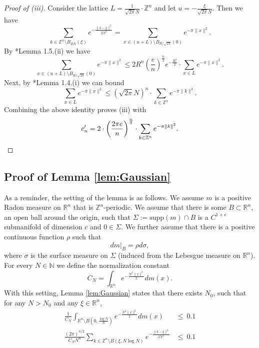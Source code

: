 \documentclass[11pt,letterpaper]{amsart}
\theoremstyle{definition}
\theoremstyle{plain}
\newcommand{\R}{{\mathbb R}}
\newcommand{\N}{{\mathbb N}}
\newcommand{\Z}{{\mathbb Z}}
\begin{document}
\begin{proof}[Proof of (iii)]
Consider the lattice $L=\frac{1}{\sqrt{2\pi}N}\cdot\Z^n$ and let $u=-\frac{\xi}{\sqrt{2\pi}N}$. Then we have
\[\sum_{k\in\Z^n\setminus B_{RN}(\xi)}e^{-\tfrac{\|k-\xi\|^2}{2N^2}}=  \sum_{x\in (u+L)\setminus B_{R/\sqrt{2\pi}}(0)}e^{-\pi\|x\|^2}.\]
By \cite{Banaszczyk}*{Lemma 1.5.(ii)} we have
\begin{equation*}
    \sum_{x\in (u+L)\setminus B_{R/\sqrt{2\pi}}(0)}e^{-\pi\|x\|^2} \leq 2  R^n \left(\frac{e}{n}\right)^{\frac{n}{2}}e^{-\frac{R^2}{2}}\cdot \sum_{x\in L}e^{-\pi\|x\|^2}.
\end{equation*}
Next, by \cite{Banaszczyk}*{Lemma 1.4.(i)} we can bound
\begin{equation*}
    \sum_{x\in L}e^{-\pi\|x\|^2}\leq \left(\sqrt{2\pi}N\right)^{{n}}\cdot\sum_{k\in\Z^n}e^{-\pi\|k\|^2}.
\end{equation*}
Combining the above identity proves (iii) with 
\begin{equation*}
     c'_n=2\cdot\left(\frac{2\pi e}{n}\right)^{\frac{n}{2}}\cdot\sum_{k\in\Z^n}e^{-\pi\|k\|^2}.\qedhere
\end{equation*}
\end{proof}
\subsection{Proof of Lemma \ref{lem:Gaussian}}
As a reminder, the setting of the lemma is as follows. We assume $m$ is a positive Radon measure on $\R^n$ that is $\Z^n$-periodic. We assume that there is some $B\subset\R^n$, an open ball around the origin, such that $\Sigma:=\mathrm{supp}(m)\cap B$ is a $C^{1+\epsilon}$ submanifold of dimension {$c$} and $0\in\Sigma$. We further assume that there is a positive continuous function $\rho$ such that 
\[dm|_{B}=\rho d\sigma,\]
where $\sigma$ is the surface measure on $\Sigma$ (induced from the Lebesgue measure on $\R^n$). For every $N\in\N$ we define the normalization constant
    \[C_{N}=\int_{\R^n}e^{-\frac{N^2\|x\|^2}{2}}dm(x).\]
With this setting, Lemma  \ref{lem:Gaussian} states that there exists $N_{0}$, such that for any $N>N_{0}$ and any $\xi\in\R^n$,
\begin{align}
	\frac{1}{C_{N}}\int_{\R^n\setminus B(0,\frac{\log N}{N})}e^{-\frac{N^2\|x\|^2}{2}}dm(x) & \le\ 0.1\\
	\frac{(2\pi)^{n/2}}{C_{N}N^{n}}\sum_{k\in\Z^n\setminus B(\xi,N\log N)}e^{-\frac{\|k-\xi\|^2}{2N^2}} & \le\ 0.1
\end{align}	
\end{document}
